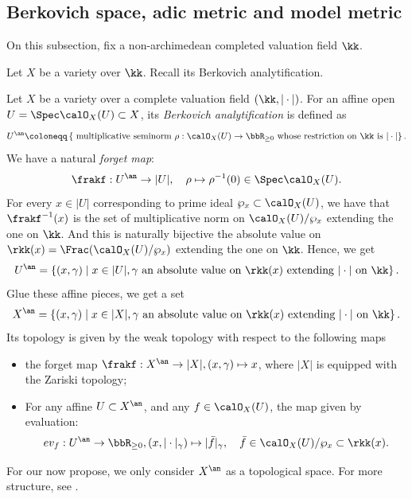 \subsection[status=draft,tag=0000000,label=\labelNFM{subsec:adic-metric-and-model-metric}]{Berkovich space, adic metric and model metric}

On this subsection, fix a non-archimedean completed valuation field $\kk$.

Let $X$ be a variety over $\kk$.
Recall its Berkovich analytification.

\begin{construction}[label=\labelNFM{constr:berkovich-analytification}, status=draft, tag=0000000]
	Let $X$ be a variety over a complete valuation field $(\kk,|\cdot|)$.
	For an affine open $U = \Spec \calO_X(U) \subset X$, its \emph{Berkovich analytification} is defined as
	\[ U^\an \coloneqq \left\{  \text{  multiplicative seminorm } \rho: \calO_X(U) \to \bbR_{\geq 0} \text{ whose restriction on } \kk \text{ is } |\cdot| \right\}. \]
	We have a natural \emph{forget map}:
	\[ \frakf: U^\an \to |U|, \quad \rho \mapsto \rho^{-1}(0) \in \Spec \calO_X(U). \]
	For every $x \in |U|$ corresponding to prime ideal $\wp_x \subset \calO_X(U)$, we have that $\frakf^{-1}(x)$ is the set of multiplicative norm on $\calO_X(U)/\wp_x$ extending the one on $\kk$.
	And this is naturally bijective the absolute value on $\rkk(x) = \Frac(\calO_X(U)/\wp_x)$ extending the one on $\kk$.
	Hence, we get
	\[ U^\an = \left\{ (x,\gamma) \;\middle|\; x \in |U|, \gamma \text{ an absolute value on } \rkk(x) \text{ extending } |\cdot| \text{ on } \kk \right\}. \]
	Glue these affine pieces, we get a set
	\[ X^\an = \left\{ (x,\gamma) \;\middle|\; x \in |X|, \gamma \text{ an absolute value on } \rkk(x) \text{ extending } |\cdot| \text{ on } \kk \right\}. \]
	Its topology is given by the weak topology with respect to the following maps
	\begin{itemize}[nosep]
		\item the forget map $\frakf: X^\an \to |X|, (x,\gamma) \mapsto x$, where $|X|$ is equipped with the Zariski topology;
		\item For any affine $U \subset X^{\an}$, and any $f \in \calO_X(U)$, the map given by evaluation:
		      \[ ev_f: U^\an \to \bbR_{\geq 0}, (x,|\cdot|_\gamma) \mapsto |\bar{f}|_\gamma, \quad \bar{f} \in \calO_X(U)/\wp_x \subset \rkk(x). \]
		      \Yang{}
	\end{itemize}
	For our now propose, we only consider $X^\an$ as a topological space.
	For more structure, see \cite{Berkovich-2012-SpectralTheoryAnalytic,Ducros-Favre-Nicaise-2015-BerkovichSpacesApplications}.
\end{construction}

